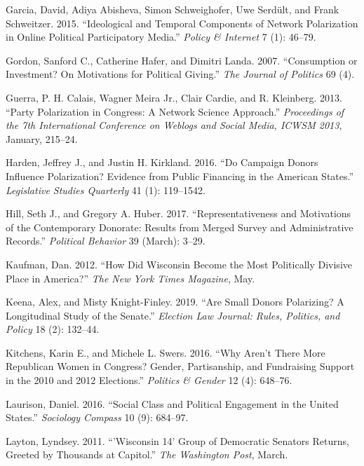 \documentclass[12pt,]{article}
\begin{document}
\leavevmode\hypertarget{ref-garcia2015}{}%
Garcia, David, Adiya Abisheva, Simon Schweighofer, Uwe Serdült, and
Frank Schweitzer. 2015. ``Ideological and Temporal Components of Network
Polarization in Online Political Participatory Media.'' \emph{Policy \&
Internet} 7 (1): 46--79.

\leavevmode\hypertarget{ref-gordon2007}{}%
Gordon, Sanford C., Catherine Hafer, and Dimitri Landa. 2007.
``Consumption or Investment? On Motivations for Political Giving.''
\emph{The Journal of Politics} 69 (4).

\leavevmode\hypertarget{ref-guerra2013}{}%
Guerra, P. H. Calais, Wagner Meira Jr., Clair Cardie, and R. Kleinberg.
2013. ``Party Polarization in Congress: A Network Science Approach.''
\emph{Proceedings of the 7th International Conference on Weblogs and
Social Media, ICWSM 2013}, January, 215--24.

\leavevmode\hypertarget{ref-harden2016}{}%
Harden, Jeffrey J., and Justin H. Kirkland. 2016. ``Do Campaign Donors
Influence Polarization? Evidence from Public Financing in the American
States.'' \emph{Legislative Studies Quarterly} 41 (1): 119--1542.

\leavevmode\hypertarget{ref-hill2017}{}%
Hill, Seth J., and Gregory A. Huber. 2017. ``Representativeness and
Motivations of the Contemporary Donorate: Results from Merged Survey and
Administrative Records.'' \emph{Political Behavior} 39 (March): 3--29.

\leavevmode\hypertarget{ref-kaufman2012}{}%
Kaufman, Dan. 2012. ``How Did Wisconsin Become the Most Politically
Divisive Place in America?'' \emph{The New York Times Magazine}, May.

\leavevmode\hypertarget{ref-keena2019}{}%
Keena, Alex, and Misty Knight-Finley. 2019. ``Are Small Donors
Polarizing? A Longitudinal Study of the Senate.'' \emph{Election Law
Journal: Rules, Politics, and Policy} 18 (2): 132--44.

\leavevmode\hypertarget{ref-kitchens2016}{}%
Kitchens, Karin E., and Michele L. Swers. 2016. ``Why Aren't There More
Republican Women in Congress? Gender, Partisanship, and Fundraising
Support in the 2010 and 2012 Elections.'' \emph{Politics \& Gender} 12
(4): 648--76.

\leavevmode\hypertarget{ref-laurison2016}{}%
Laurison, Daniel. 2016. ``Social Class and Political Engagement in the
United States.'' \emph{Sociology Compass} 10 (9): 684--97.

\leavevmode\hypertarget{ref-layton2011}{}%
Layton, Lyndsey. 2011. ``'Wisconsin 14' Group of Democratic Senators
Returns, Greeted by Thousands at Capitol.'' \emph{The Washington Post},
March.
\end{document}
